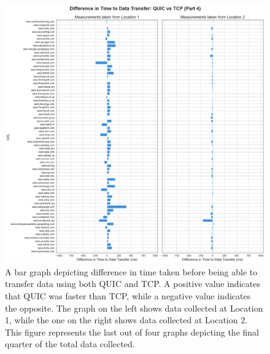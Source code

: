 \documentclass{l4proj}
\begin{document}
\begin{appendices}
\begin{figure}
    \centering
    \includegraphics[width=1\linewidth]
    {images/urlDifference_QUICvsTCP_part4.png}
    \caption{A bar graph depicting difference in time taken before being able to transfer data using both QUIC and TCP. A positive value indicates that QUIC was faster than TCP, while a negative value indicates the opposite. The graph on the left shows data collected at Location 1, while the one on the right shows data collected at Location 2. This figure represents the last out of four graphs depicting the final quarter of the total data collected.}
    \label{fig:urlDifference_p4}
\end{figure}


\end{appendices}




\renewcommand{\thechapter}{0} 

\end{document}
